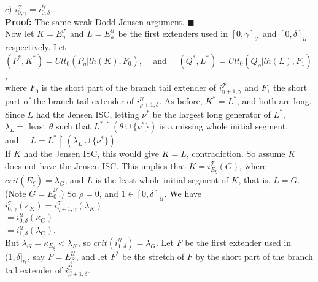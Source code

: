 \documentclass[12pt]{article}
\begin{document}
\indent $c)$ $i_{0 , \gamma }^{\mathscr{T}} = i_{0 , \delta }^{\mathscr{U}}$.\\

\indent \indent \textbf{Proof:} The same weak Dodd-Jensen argument. $\blacksquare$\\

Now let $K = E_\eta^{\mathscr{T}}$ and $L = E_\rho^{\mathscr{U}}$ be the first extenders used in $[ 0 , \gamma ]_{\mathscr{T}}$ and $[ 0 , \delta ]_{\mathscr{U}}$ respectively.  Let\\

\indent $ (P^* , K^* ) = Ult_0 (P_\eta | lh (K), F_0 )$, \ \ and \ \ $ (Q^* , L^* ) = Ult_0 (Q_\rho | lh (L), F_1 )$,\\

where $F_0$ is the short part of the branch tail extender of $i_{\eta + 1 , \gamma}^{\mathscr{T}}$ and $F_1$ the short part of the branch tail extender of $i_{\rho + 1 , \delta}^{\mathscr{U}}$.  As before, $K^* = L^*$, and both are long.  Since $L$ had the Jensen ISC, letting $\nu^*$ be the largest long generator of $L^*$,\\

\indent $\lambda_L =$ least $\theta$ such that $L^* \restriction ( \theta \cup \{ \nu^* \}  )$ is a missing whole initial segment,\\

and \ \ $L = L^* \restriction ( \lambda_L \cup \{ \nu^* \} )$.\\

If $K$ had the Jensen ISC, this would give $K = L$, contradiction.  So assume $K$ does not have the Jensen ISC.  This implies that $K = i_{E_\xi}^{\mathscr{T}} (G)$, where $crit (E_\xi ) = \lambda_G$, and $L$ is the least whole initial segment of $K$, that is, $L = G$.  (Note $G = E_0^{\mathscr{U}}$.)  So $\rho = 0$, and $1 \in [ 0 , \delta ]_{\mathscr{U}}$.  We have\\

\indent $i_{0 , \gamma }^{\mathscr{T}} (\kappa_K ) = i_{\eta + 1 , \gamma }^{\mathscr{T}} (\lambda_K )$\\

\indent \indent $= i_{0 , \delta}^{\mathscr{U}} (\kappa_G )$\\

\indent \indent $= i_{1 , \delta}^{\mathscr{U}} (\lambda_G )$.\\

But $\lambda_G = \kappa_{E_\xi} < \lambda_K$, so $crit (i_{1, \delta}^{\mathscr{U}} ) = \lambda_G $.  Let $F$ be the first extender used in $( 1, \delta ]_{\mathscr{U}}$, say $F = E_\beta^{\mathscr{U}}$, and let $F^*$ be the stretch of $F$ by the short part of the branch tail extender of $i_{\beta + 1 , \delta }^{\mathscr{U}}$.\\
\end{document}
